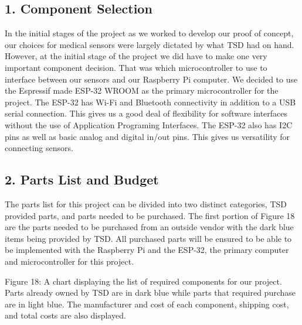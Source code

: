 ﻿\documentclass[10pt]{article}
\begin{document}
\subsection{1. Component Selection}
In the initial stages of the project as we worked to develop our proof of concept, our choices for medical sensors were largely dictated by what TSD had on hand. However, at the initial stage of the project we did have to make one very important component decision. That was which microcontroller to use to interface between our sensors and our Raspberry Pi computer. We decided to use the Espressif made ESP-32 WROOM as the primary microcontroller for the project. The ESP-32 has Wi-Fi and Bluetooth connectivity in addition to a USB serial connection. This gives us a good deal of flexibility for software interfaces without the use of Application Programing Interfaces. The ESP-32 also has I2C pins as well as basic analog and digital in/out pins. This gives us versatility for connecting sensors.

\subsection{2. Parts List and Budget}
The parts list for this project can be divided into two distinct categories, TSD provided parts, and parts needed to be purchased. The first portion of Figure 18 are the parts needed to be purchased from an outside vendor with the dark blue items being provided by TSD. All purchased parts will be ensured to be able to  be implemented with the Raspberry Pi and the ESP-32, the primary computer and  microcontroller for this project.

%	 
%	 
%	 
%	 
%	 
%	 
%	 
%	 
%	 
%	 
Figure 18: A chart displaying the list of required components for our project. Parts already owned by TSD are in dark blue while parts that required purchase are in light blue. The manufacturer and cost of each component, shipping cost, and total costs are also displayed. 
\end{document}
